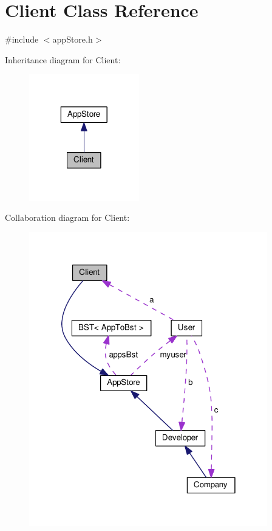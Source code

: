 \hypertarget{class_client}{\section{Client Class Reference}
\label{class_client}
}


{\ttfamily \#include $<$app\-Store.\-h$>$}



Inheritance diagram for Client\-:
\nopagebreak
\begin{figure}[H]
\begin{center}
\leavevmode
\includegraphics[width=136pt]{class_client__inherit__graph}
\end{center}
\end{figure}


Collaboration diagram for Client\-:
\nopagebreak
\begin{figure}[H]
\begin{center}
\leavevmode
\includegraphics[width=294pt]{class_client__coll__graph}
\end{center}
\end{figure}

